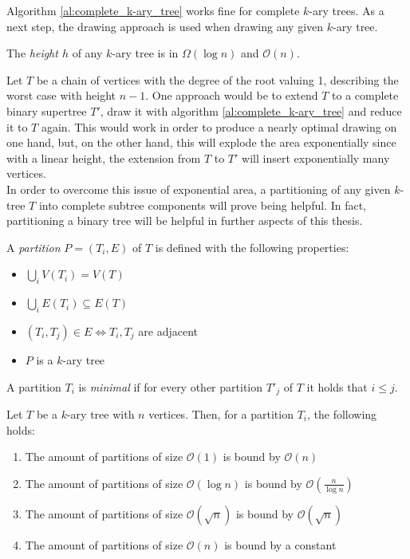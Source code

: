 Algorithm \ref{al:complete_k-ary_tree} works fine for complete $k$-ary trees. As a next step, the drawing approach is used when drawing any given $k$-ary tree. 
\begin{lemma}
	The \emph{height $h$} of any $k$-ary tree is in $\Omega(\log n)$ and $\mathcal{O}(n)$.
\end{lemma}
Let $T$ be a chain of vertices with the degree of the root valuing 1, describing the worst case with height $n-1$. One approach would be to extend $T$ to a complete binary supertree $T'$, draw it with algorithm \ref{al:complete_k-ary_tree} and reduce it to $T$ again. This would work in order to produce a nearly optimal drawing on one hand, but, on the other hand, this will explode the area exponentially since with a linear height, the extension from $T$ to $T'$ will insert exponentially many vertices.\\
In order to overcome this issue of exponential area, a partitioning of any given $k$-tree $T$ into complete subtree components will prove being helpful. In fact, partitioning a binary tree will be helpful in further aspects of this thesis.
\begin{definition}
	A \emph{partition} $P=(T_i, E)$ of $T$ is defined with the following properties:
	\begin{itemize}
		\item $\bigcup_{i} V(T_i) = V(T)$
		\item $\bigcup_{i} E(T_i) \subseteq E(T)$
		\item $(T_i,T_j)\in E \Leftrightarrow T_i, T_j$ are adjacent
		\item $P$ is a $k$-ary tree
	\end{itemize}
	A partition $T_i$ is \emph{minimal} if for every other partition $T'_j$ of $T$ it holds that $i\leq j$.
\end{definition}
Let $T$ be a $k$-ary tree with $n$ vertices. Then, for a partition $T_i$, the following holds:
\begin{enumerate}
	\item The amount of partitions of size $\mathcal{O}(1)$ is bound by $\mathcal{O}(n)$
	\item The amount of partitions of size $\mathcal{O}(\log n)$ is bound by $\mathcal{O}\left(\frac{n}{\log n}\right)$
	\item The amount of partitions of size $\mathcal{O}(\sqrt{n})$ is bound by $\mathcal{O}(\sqrt{n})$
	\item The amount of partitions of size $\mathcal{O}(n)$ is bound by a constant
\end{enumerate}
